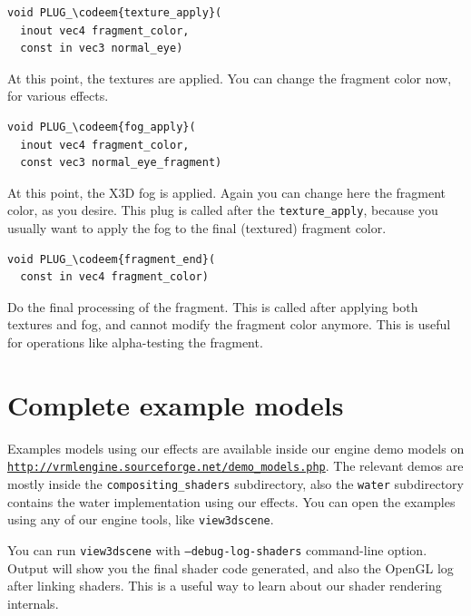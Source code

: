 \documentclass{acmsiggraph}                     %
\newcommand*{\codeem}[1]{\textbf{#1}}
\newcommand*{\myhref}[2]{\texttt{\href{#1}{\nolinkurl{#2}}}}
\begin{document}
\begin{Verbatim}[commandchars=\\\{\},frame=single]
void PLUG_\codeem{texture_apply}(
  inout vec4 fragment_color,
  const in vec3 normal_eye)
\end{Verbatim}

At this point, the textures are applied. You can change the fragment
color now, for various effects.

\begin{Verbatim}[commandchars=\\\{\},frame=single]
void PLUG_\codeem{fog_apply}(
  inout vec4 fragment_color,
  const vec3 normal_eye_fragment)
\end{Verbatim}

At this point, the X3D fog is applied. Again you can change here the
fragment color, as you desire. This plug is called after
the \texttt{texture\_apply}, because you usually want to apply the fog
to the final (textured) fragment color.

\begin{Verbatim}[commandchars=\\\{\},frame=single]
void PLUG_\codeem{fragment_end}(
  const in vec4 fragment_color)
\end{Verbatim}

Do the final processing of the fragment. This is called after applying
both textures and fog, and cannot modify the fragment color anymore.
This is useful for operations like alpha-testing the fragment.

\section{Complete example models}

Examples models using our effects are available inside our engine demo models on
\myhref{http://vrmlengine.sourceforge.net/demo\_models.php}{http://vrmlengine.sourceforge.net/demo_models.php}.
The relevant demos are mostly inside the \texttt{compositing\_shaders}
subdirectory, also the \texttt{water} subdirectory contains
the water implementation using our effects.
You can open the examples using any of our engine tools,
like \texttt{view3dscene}.

You can run \texttt{view3dscene} with \texttt{--debug-log-shaders} command-line
option. Output will show you the final shader code generated,
and also the OpenGL log after linking shaders.
This is a useful way to learn about our shader rendering internals.
\end{document}
